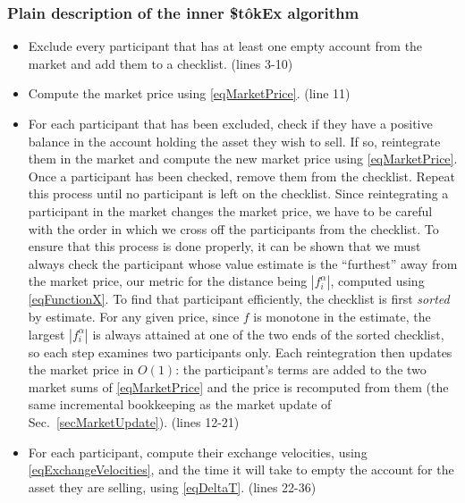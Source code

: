 \documentclass[letterpaper]{article}
\newcommand{\StokEx}{\$t\^{o}kEx}
\begin{document}
\subsubsection{Plain description of the inner \StokEx{} algorithm}
\begin{itemize}
    \item Exclude every participant that has at least one empty account from the market and add them to a checklist. (lines 3-10)
    \item Compute the market price using \eqref{eqMarketPrice}. (line 11)
    \item For each participant that has been excluded, check if they have a positive balance in the account holding the asset they wish to sell. If so, reintegrate them in the market and compute the new market price using \eqref{eqMarketPrice}. Once a participant has been checked, remove them from the checklist. Repeat this process until no participant is left on the checklist. Since reintegrating a participant in the market changes the market price, we have to be careful with the order in which we cross off the participants from the checklist. To ensure that this process is done properly, it can be shown that we must always check the participant whose value estimate is the ``furthest'' away from the market price, our metric for the distance being $|f_i^\alpha|$, computed using \eqref{eqFunctionX}. To find that participant efficiently, the checklist is first \emph{sorted} by estimate. For any given price, since $f$ is monotone in the estimate, the largest $|f_i^\alpha|$ is always attained at one of the two ends of the sorted checklist, so each step examines two participants only. Each reintegration then updates the market price in $O(1)$: the participant's terms are added to the two market sums of \eqref{eqMarketPrice} and the price is recomputed from them (the same incremental bookkeeping as the market update of Sec.~\ref{secMarketUpdate}). (lines 12-21)
    \item For each participant, compute their exchange velocities, using \eqref{eqExchangeVelocities}, and the time it will take to empty the account for the asset they are selling, using \eqref{eqDeltaT}. (lines 22-36)
\end{itemize}
\end{document}
